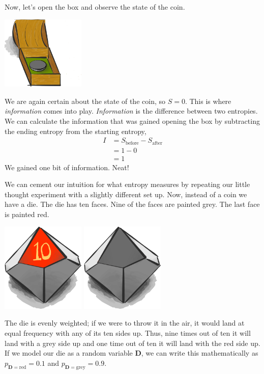 Now, let's open the box and observe the state of the coin.
\begin{center}
\includegraphics[width=0.3\textwidth]{img/big-box-open-coin}
\end{center}
We are again certain about the state of the coin, so $S = 0$.
This is where \textit{information} comes into play.
\textit{Information} is the difference between two entropies.
We can calculate the information that was gained opening the box by subtracting the ending entropy from the starting entropy,
\begin{align*}
I
&= S_{\text{before}} - S_{\text{after}} \\
&= 1 - 0 \\
&= 1
\end{align*}
We gained one bit of information.
Neat!

We can cement our intuition for what entropy measures by repeating our little thought experiment with a slightly different set up.
Now, instead of a coin we have a die.
The die has ten faces.
Nine of the faces are painted grey.
The last face is painted red.
\begin{center}
\includegraphics[width=0.3\textwidth]{img/red-die}
\includegraphics[width=0.3\textwidth]{img/grey-die}
\end{center}
The die is evenly weighted;
if we were to throw it in the air, it would land at equal frequency with any of its ten sides up.
Thus, nine times out of ten it will land with a grey side up and one time out of ten it will land with the red side up.
If we model our die as a random variable $\bm{D}$, we can write this mathematically as $p_{\bm{D} = \text{red}} = 0.1$ and $p_{\bm{D} = \text{grey}} = 0.9$.

